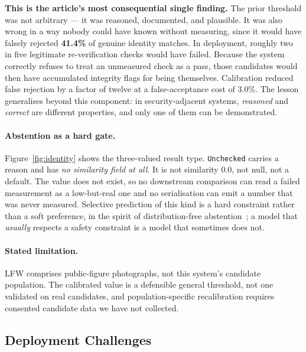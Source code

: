 \textbf{This is the article's most consequential single finding.} The prior threshold was not arbitrary --- it was reasoned, documented, and plausible. It was also wrong in a way nobody could have known without measuring, since it would have falsely rejected \textbf{41.4\%} of genuine identity matches. In deployment,
roughly two in five legitimate re-verification checks would have failed. Because the system correctly refuses to treat an unmeasured check as a pass, those candidates would then have accumulated integrity flags for being themselves.
Calibration reduced false rejection by a factor of twelve at a false-acceptance
cost of 3.0\%. The lesson generalises beyond this component: in
security-adjacent systems, \emph{reasoned} and \emph{correct} are different
properties, and only one of them can be demonstrated.

\paragraph{Abstention as a hard gate.}
Figure~\ref{fig:identity} shows the three-valued result type.
\texttt{Unchecked} carries a reason and has \emph{no similarity field at all}. It is not similarity 0.0, not null, not a default. The value does not exist, so no downstream comparison can read a failed measurement as a low-but-real one and
no serialisation can emit a number that was never measured. Selective prediction
of this kind is a hard constraint rather than a soft preference, in the spirit of
distribution-free abstention~\cite{vovk2005algorithmic}; a model that
\emph{usually} respects a safety constraint is a model that sometimes does not.

\paragraph{Stated limitation.}
LFW comprises public-figure photographs, not this system's candidate population.
The calibrated value is a defensible general threshold, not one validated on real
candidates, and population-specific recalibration requires consented candidate
data we have not collected.

\subsection{Deployment Challenges}


